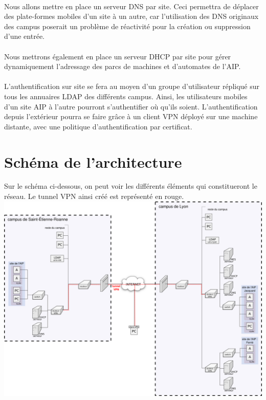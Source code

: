 \documentclass[a4paper]{article}
\begin{document}
	\paragraph*{} %
	Nous allons mettre en place un serveur DNS par site. Ceci permettra de déplacer des plate-formes mobiles d'un site à un autre, car l'utilisation des DNS originaux des campus poserait un problème de réactivité pour la création ou suppression d'une entrée. 
	
	\paragraph*{} %
	Nous mettrons également en place un serveur DHCP par site pour gérer dynamiquement l'adressage des parcs de machines et d'automates de l'AIP. 
	
	\paragraph*{} %
	L'authentification sur site se fera au moyen d'un groupe d'utilisateur répliqué sur tous les annuaires LDAP des différents campus. Ainsi, les utilisateurs mobiles d'un site AIP à l'autre pourront s'authentifier où qu'ils soient. L'authentification depuis l'extérieur pourra se faire grâce à un client VPN déployé sur une machine distante, avec une politique d'authentification par certificat. 
	
	
	\newpage
	
	
	\section{Schéma de l'architecture}
	Sur le schéma ci-dessous, on peut voir les différents éléments qui constitueront le réseau. Le tunnel VPN ainsi créé est représenté en rouge. \\
	\includegraphics[width=\linewidth]{schema_archi.png}

	
	
\end{document}
